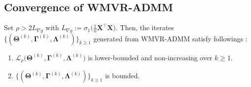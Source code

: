 \documentclass[alpha-refs]{wiley-article}
\begin{document}
\subsection{Convergence of WMVR-ADMM}

\begin{lemma} \label{Lemma2.3}
Set $\rho>2L_{\nabla g}$ with $L_{\nabla g}:=\sigma_{1}\big( \frac{1}{n}\boldsymbol{X}^{\top}\boldsymbol{X}\big)$.
Then, the iterates $\{(\boldsymbol{\Theta}^{(k)},\boldsymbol{\Gamma}^{(k)},\boldsymbol{\Lambda}^{(k)})\}_{k \geq 1}$ generated from WMVR-ADMM satisfy followings :
\begin{enumerate}
    \item $\mathcal{L}_{\rho} \big( \boldsymbol{\Theta}^{(k)},\boldsymbol{\Gamma}^{(k)},\boldsymbol{\Lambda}^{(k)} \big)$ is lower-bounded and non-increasing over $k \geq 1$.
    \item $\{(\boldsymbol{\Theta}^{(k)},\boldsymbol{\Gamma}^{(k)},\boldsymbol{\Lambda}^{(k)})\}_{k \geq 1}$ is bounded.
\end{enumerate}
\end{lemma}
\end{document}
